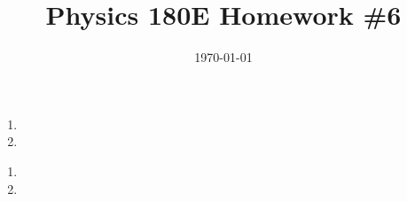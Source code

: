 \documentclass{article}
\date{\today}
\title{Physics 180E Homework \#6}
\begin{document}
\maketitle

\begin{prob}
\end{prob}
\begin{enumerate}[label=(\alph*)]
    \item
    \item
\end{enumerate}


\bigskip
\par
\begin{prob}
\end{prob}
\begin{enumerate}[label=(\alph*)]
    \item
    \item
\end{enumerate}



\end{document}
